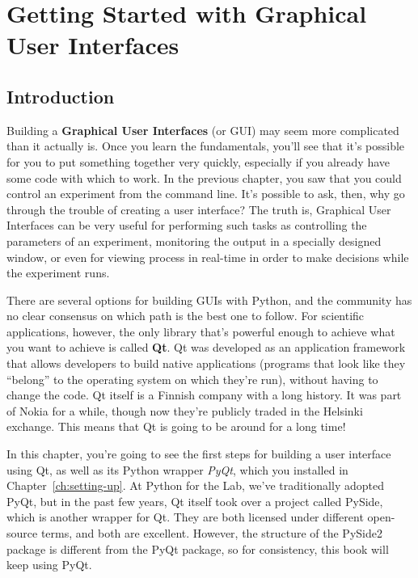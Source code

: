\chapter[Graphical User Interfaces]{Getting Started with Graphical User Interfaces}\label{ch:starting-gui}

\section{Introduction}\label{sec:gui-introduction}
Building a \textbf{Graphical User Interfaces} (or GUI) may seem more complicated than it actually is. Once you learn the fundamentals, you'll see that it's possible for you to put something together very quickly, especially if you already have some code with which to work. In the previous chapter, you saw that you could control an experiment from the command line. It's possible to ask, then, why go through the trouble of creating a user interface? The truth is, Graphical User Interfaces can be very useful for performing such tasks as controlling the parameters of an experiment, monitoring the output in a specially designed window, or even for viewing process in real-time in order to make decisions while the experiment runs.

There are several options for building GUIs with Python, and the community has no clear consensus on which path is the best one to follow. For scientific applications, however, the only library that's powerful enough to achieve what you want to achieve is called \textbf{Qt}. Qt was developed as an application framework that allows developers to build native applications (programs that look like they ``belong'' to the operating system on which they're run), without having to change the code. Qt itself is a Finnish company with a long history. It was part of Nokia for a while, though now they're publicly traded in the Helsinki exchange. This means that Qt is going to be around for a long time!

In this chapter, you're going to see the first steps for building a user interface using Qt, as well as its Python wrapper \emph{PyQt}, which you installed in Chapter~\ref{ch:setting-up}. At Python for the Lab, we've traditionally adopted PyQt, but in the past few years, Qt itself took over a project called PySide, which is another wrapper for Qt. They are both licensed under different open-source terms, and both are excellent. However, the structure of the PySide2 package is different from the PyQt package, so for consistency, this book will keep using PyQt.

